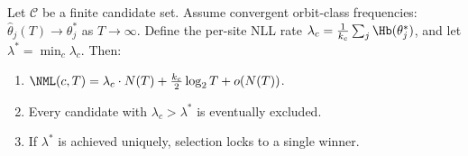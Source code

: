 \begin{theorem}[Stabilization]\label{thm:stabilization}
Let $\mathcal{C}$ be a finite candidate set.
Assume convergent orbit-class frequencies: $\hat{\theta}_j(T) \to \theta_j^*$ as $T \to \infty$.
Define the per-site NLL rate $\lambda_c = \frac{1}{k_c} \sum_{j} \Hb(\theta_j^*)$, and let $\lambda^* = \min_c \lambda_c$.
Then:
\begin{enumerate}
    \item[\textup{(i)}] $\NML(c, T) = \lambda_c \cdot N(T) + \frac{k_c}{2}\log_2 T + o(N(T))$.
    \item[\textup{(ii)}] Every candidate with $\lambda_c > \lambda^*$ is eventually excluded.
    \item[\textup{(iii)}] If $\lambda^*$ is achieved uniquely, selection locks to a single winner.
\end{enumerate}
\end{theorem}

